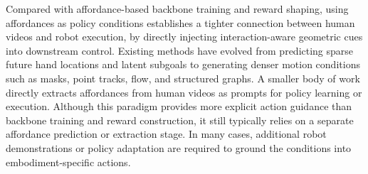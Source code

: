 \documentclass[Afour,sageh,times]{sagej}
\begin{document}
Compared with affordance-based backbone training and reward shaping, using affordances as policy conditions establishes a tighter connection between human videos and robot execution, by directly injecting interaction-aware geometric cues into downstream control. Existing methods have evolved from predicting sparse future hand locations and latent subgoals to generating denser motion conditions such as masks, point tracks, flow, and structured graphs. A smaller body of work directly extracts affordances from human videos as prompts for policy learning or execution. Although this paradigm provides more explicit action guidance than backbone training and reward construction, it still typically relies on a separate affordance prediction or extraction stage. In many cases, additional robot demonstrations or policy adaptation are required to ground the conditions into embodiment-specific actions.
\end{document}
